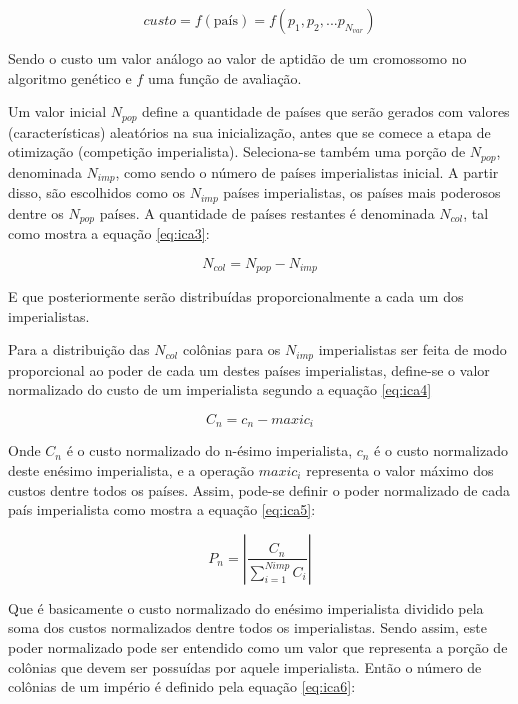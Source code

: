 \begin{equation}
\label{eq:ica2}
custo = f (\text{país}) = f (p_{1},p_{2},...p_{N_{var}})
\end{equation}

Sendo o custo um valor análogo ao valor de aptidão de um cromossomo no algoritmo genético e \(f\) uma função de avaliação.

Um valor inicial \(N_{pop}\) define a quantidade de países que serão gerados com valores (características) aleatórios na sua inicialização, antes que se comece a etapa de otimização (competição imperialista). Seleciona-se também uma porção de \(N_{pop}\), denominada \(N_{imp}\), como sendo o número de países imperialistas inicial. A partir disso, são escolhidos como os \(N_{imp}\) países imperialistas, os países mais poderosos dentre os \(N_{pop}\) países. A quantidade de países restantes é denominada \(N_{col}\), tal como mostra a equação \ref{eq:ica3}: 

\begin{equation}
\label{eq:ica3}
N_{col} = N_{pop} - N_{imp} 
\end{equation}

E que posteriormente serão distribuídas proporcionalmente a cada um dos imperialistas.

Para a distribuição  das \(N_{col}\) colônias para os \(N_{imp} \) imperialistas ser feita de modo proporcional ao poder de cada um destes países imperialistas, define-se o valor normalizado do custo de um imperialista segundo a equação \ref{eq:ica4}

\begin{equation}
\label{eq:ica4}
C_{n} =  c_{n} - maxi{c_{i}}
\end{equation}

Onde \(C_{n}\) é o custo normalizado do n-ésimo imperialista, \(c_{n}\) é o custo normalizado deste enésimo imperialista, e a operação \(maxi{c_{i}}\) representa o valor máximo dos custos dentre todos os países. Assim, pode-se definir o poder normalizado de cada país imperialista como mostra a equação \ref{eq:ica5}:

\begin{equation}
\label{eq:ica5}
P_{n} = \left| \frac{C_{n}}{\sum_{i=1}^{Nimp}C_{i}}\right| 
\end{equation}

Que é basicamente o custo normalizado do enésimo imperialista dividido pela soma dos custos normalizados dentre todos os imperialistas. Sendo assim, este poder normalizado pode ser entendido como um valor que representa a porção de colônias que devem ser possuídas por aquele imperialista. Então o número de colônias de um império é definido pela equação \ref{eq:ica6}:

